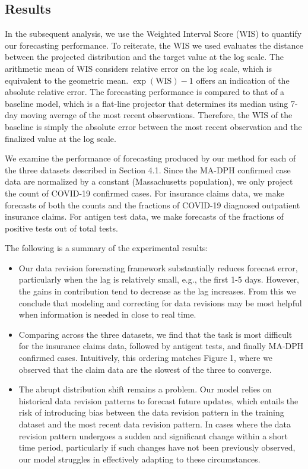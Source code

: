\subsection{Results}
In the subsequent analysis, we use the Weighted Interval Score (WIS) to quantify our forecasting performance. To reiterate, the WIS we used evaluates the distance between the projected distribution and the target value at the log scale. The arithmetic mean of WIS considers relative error on the log scale, which is equivalent to the geometric mean. $\exp(\text{WIS}) - 1$ offers an indication of the absolute relative error. The forecasting performance is compared to that of a baseline model, which is a flat-line projector that determines its median using 7-day moving average of the most recent observations. Therefore, the WIS of the baseline is simply the absolute error between the most recent observation and the finalized value at the log scale. 

We examine the performance of forecasting produced by our method for each of the three datasets described in Section 4.1. Since the MA-DPH confirmed case data are normalized by a constant (Massachusetts population), we only project the count of COVID-19 confirmed cases. For insurance claims data, we make forecasts of both the counts and the fractions of COVID-19 diagnosed outpatient insurance claims. For antigen test data, we make forecasts of the fractions of positive tests out of total tests. 

The following is a summary of the experimental results:
\begin{itemize}
    \item Our data revision forecasting framework substantially reduces forecast error, particularly when the lag is relatively small, e.g., the first 1-5 days. However, the gains in contribution tend to decrease as the lag increases. From this we conclude that modeling and correcting for data revisions may be most helpful when information is needed in close to real time.
    \item Comparing across the three datasets, we find that the task is most difficult for the insurance claims data, followed by antigent tests, and finally MA-DPH confirmed cases. Intuitively, this ordering matches Figure 1, where we observed that the claim data are the slowest of the three to converge.
    \item The abrupt distribution shift remains a problem. Our model relies on historical data revision patterns to forecast future updates, which entails the risk of introducing bias between the data revision pattern in the training dataset and the most recent data revision pattern. In cases where the data revision pattern undergoes a sudden and significant change within a short time period, particularly if such changes have not been previously observed, our model struggles in effectively adapting to these circumstances.
\end{itemize}

